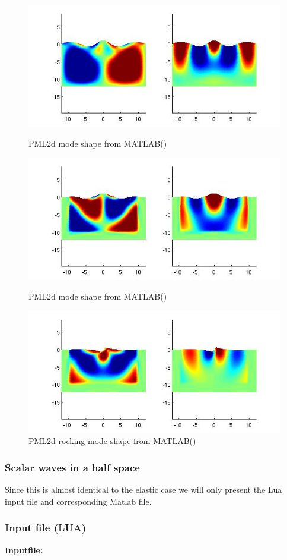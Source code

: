 \begin{figure}[htbp]
    \centering
    \includegraphics[width=0.7\linewidth]{fig/pml2d_mode0_matlab.jpg}
    \caption{PML2d mode shape from MATLAB()}
    \label{fig:PML2dModeShape0MATLAB}
    \includegraphics[width=0.7\linewidth]{fig/pml2d_mode40_matlab.jpg}
    \caption{PML2d mode shape from MATLAB()}
    \label{fig:PML2dModeShape40MATLAB}
    \includegraphics[width=0.7\linewidth]{fig/pml2d_mode40r_matlab.jpg}
    \caption{PML2d rocking mode shape from MATLAB()}
    \label{fig:PML2dModeShape40RockingMATLAB}
\end{figure}

\clearpage
\subsubsection{Scalar waves in a half space}
Since this is almost identical to the elastic case we
will only present the Lua input file and corresponding 
Matlab file.

\clearpage
\subsubsection*{Input file (LUA)}
\begin{flushleft}
  \textbf{Inputfile:}
  \\
\end{flushleft}
\hspace{1in}
{\footnotesize
{}
}


